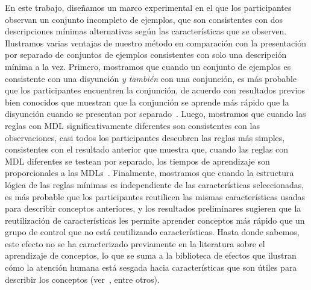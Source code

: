 En este trabajo, diseñamos un marco experimental en el que los participantes observan un conjunto incompleto de ejemplos, que son consistentes con dos descripciones mínimas alternativas según las características que se observen. Ilustramos varias ventajas de nuestro método en comparación con la presentación por separado de conjuntos de ejemplos consistentes con solo una descripción mínima a la vez. Primero, mostramos que cuando un conjunto de ejemplos es consistente con una disyunción \textit{y también} con una conjunción, es más probable que los participantes encuentren la conjunción, de acuerdo con resultados previos bien conocidos que muestran que la conjunción se aprende más rápido que la disyunción cuando se presentan por separado~\cite{bourne1970knowing}. Luego, mostramos que cuando las reglas con MDL significativamente diferentes son consistentes con las observaciones, casi todos los participantes descubren las reglas más simples, consistentes con el resultado anterior que muestra que, cuando las reglas con MDL diferentes se testean por separado, los tiempos de aprendizaje son proporcionales a las MDLs~\cite{feldman2000minimization}. Finalmente, mostramos que cuando la estructura lógica de las reglas mínimas es independiente de las características seleccionadas, es más probable que los participantes reutilicen las mismas características usadas para describir conceptos anteriores, y los resultados preliminares sugieren que la reutilización de características les permite aprender conceptos más rápido que un grupo de control que no está reutilizando características. Hasta donde sabemos, este efecto no se ha caracterizado previamente en la literatura sobre el aprendizaje de conceptos, lo que se suma a la biblioteca de efectos que ilustran cómo la atención humana está sesgada hacia características que son útiles para describir los conceptos (ver~\cite{blair2009extremely, kruschke2000blocking, kruschke2005eye, hoffman2010costs}, entre otros).


